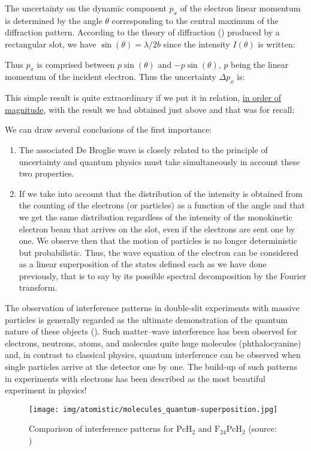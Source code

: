 	The uncertainty on the dynamic component $p_x$ of the electron linear momentum is determined by the angle $\theta$ corresponding to the central maximum of the diffraction pattern. According to the theory of diffraction () produced by a rectangular slot, we have $\sin(\theta)=\lambda/2b$ since the intensity $I(\theta)$ is written:
	
	Thus $p_x$ is comprised between $p\sin(\theta)$ and $-p\sin(\theta)$, $p$ being the linear momentum of the incident electron. Thus the uncertainty $\Delta p_x$ is:
	
	This simple result is quite extraordinary if we put it in relation, \underline{in order of magnitude}, with the result we had obtained just above and that was for recall:
	
	We can draw several conclusions of the first importance:
	\begin{enumerate}
		\item The associated De Broglie wave  is closely related to the principle of uncertainty and quantum physics must take simultaneously in account these two properties.

		\item If we take into account that the distribution of the intensity is obtained from the counting of the electrons (or particles) as a function of the angle and that we get the same distribution regardless of the intensity of the monokinetic electron beam that arrives on the slot, even if the electrons are sent one by one. We observe then that the motion of particles is no longer deterministic but probabilistic. Thus, the wave equation of the electron can be considered as a linear superposition of the states defined each as we have done previously, that is to say by its possible spectral decomposition by the Fourier transform.
	\end{enumerate}
	The observation of interference patterns in double-slit experiments with massive particles is generally regarded as the ultimate demonstration of the quantum nature of these objects (). Such matter–wave interference has been observed for electrons, neutrons, atoms, and molecules quite huge molecules (phthalocyanine) and, in contrast to classical physics, quantum interference can be observed when single particles arrive at the detector one by one. The build-up of such patterns in experiments with electrons has been described as the most beautiful experiment in physics!
	\begin{figure}[H]
		\centering
		\texttt{[image: img/atomistic/molecules\_quantum-superposition.jpg]}
		\caption{Comparison of interference patterns for $\mathrm{PcH}_2$ and $\mathrm{F}_{24}\mathrm{PcH}_2$ (source: \cite{juffmann2012real})}
	\end{figure}
